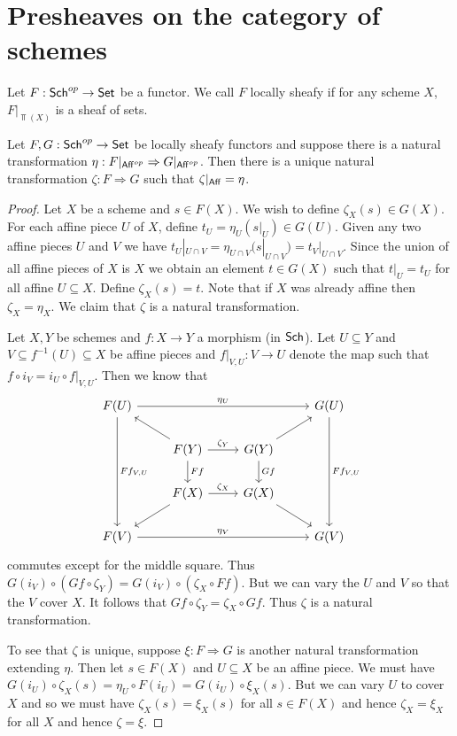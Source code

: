 \documentclass{memoir}
\begin{document}
\section{Presheaves on the category of schemes}
\begin{definition}
    Let $F:{\normalfont\mathsf{Sch}}^{op}\to {\normalfont\mathsf{Set}}$ be a functor.
    We call $F$ locally sheafy if for any scheme $X$, $F|_{\Top(X)}$ is a sheaf of sets.
\end{definition}
\begin{thm}
    Let $F,G:{\normalfont\mathsf{Sch}}^{op}\to {\normalfont\mathsf{Set}}$ be locally sheafy functors and suppose there is a natural transformation $\eta:F|_{{\normalfont\mathsf{Aff}}^{op}}\Rightarrow G|_{{\normalfont\mathsf{Aff}}^{op}}$.
    Then there is a unique natural transformation $\zeta:F\Rightarrow G$ such that $\zeta|_{{\normalfont\mathsf{Aff}}} = \eta$.
\end{thm}
\begin{proof}
    Let $X$ be a scheme and $s\in F(X)$.
    We wish to define $\zeta_X(s)\in G(X)$.
    For each affine piece $U$ of $X$, define $t_U = \eta_{U}(s|_{U})\in G(U)$.
    Given any two affine pieces $U$ and $V$ we have $t_U|_{U\cap V} = \eta_{U\cap V}(s|_{U\cap V}) = t_V|_{U\cap V}$.
    Since the union of all affine pieces of $X$ is $X$ we obtain an element $t\in G(X)$ such that $t|_U = t_U$ for all affine $U\subseteq X$.
    Define $\zeta_X(s) = t$.
    Note that if $X$ was already affine then $\zeta_X = \eta_X$.
    We claim that $\zeta$ is a natural transformation.
    
    Let $X,Y$ be schemes and $f:X\to Y$ a morphism (in ${\normalfont\mathsf{Sch}}$).
    Let $U\subseteq Y$ and $V\subseteq f^{-1}(U)\subseteq X$ be affine pieces and $f|_{V,U}:V\to U$ denote the map such that $f \circ i_V = i_U \circ f|_{V,U}$.
    Then we know that 
    \begin{equation}
        \begin{tikzcd}
            F(U) \arrow[rrr,"\eta_U"] \arrow[ddd,"Ff_{V,U}"] & & & G(U) \arrow[ddd,"Ff_{V,U}"] \\
                                         & F(Y) \arrow[r,"\zeta_Y"] \arrow[ul] \arrow[d,"Ff"] & G(Y) \arrow[d,"Gf"] \arrow[ur] & \\
                                        & F(X) \arrow[r,"\zeta_X"] \arrow[dl] & G(X) \arrow[dr] & \\
            F(V) \arrow[rrr,"\eta_V"] & & & G(V)
        \end{tikzcd}
    \end{equation}
    commutes except for the middle square.
    Thus $G(i_V) \circ (Gf \circ \zeta_Y) = G(i_V) \circ (\zeta_X \circ Ff)$.
    But we can vary the $U$ and $V$ so that the $V$ cover $X$.
    It follows that $Gf \circ \zeta_Y = \zeta_X \circ Gf$.
    Thus $\zeta$ is a natural transformation.

    To see that $\zeta$ is unique, suppose $\xi:F\Rightarrow G$ is another natural transformation extending $\eta$.
    Then let $s\in F(X)$ and $U\subseteq X$ be an affine piece.
    We must have $G(i_U) \circ \zeta_X(s) = \eta_U \circ F(i_U) = G(i_U) \circ \xi_X(s)$.
    But we can vary $U$ to cover $X$ and so we must have $\zeta_X(s) = \xi_X(s)$ for all $s\in F(X)$ and hence $\zeta_X = \xi_X$ for all $X$ and hence $\zeta = \xi$.
\end{proof}
\end{document}
